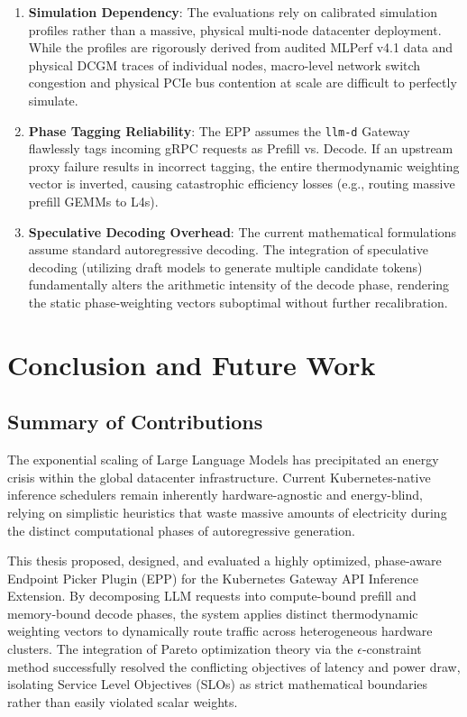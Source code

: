 \documentclass[12pt,a4paper,oneside]{report}
\begin{document}
\begin{enumerate}
    \item \textbf{Simulation Dependency}: The evaluations rely on calibrated simulation profiles rather than a massive, physical multi-node datacenter deployment. While the profiles are rigorously derived from audited MLPerf v4.1 data and physical DCGM traces of individual nodes, macro-level network switch congestion and physical PCIe bus contention at scale are difficult to perfectly simulate.
    \item \textbf{Phase Tagging Reliability}: The EPP assumes the \texttt{llm-d} Gateway flawlessly tags incoming gRPC requests as Prefill vs. Decode. If an upstream proxy failure results in incorrect tagging, the entire thermodynamic weighting vector is inverted, causing catastrophic efficiency losses (e.g., routing massive prefill GEMMs to L4s).
    \item \textbf{Speculative Decoding Overhead}: The current mathematical formulations assume standard autoregressive decoding. The integration of speculative decoding (utilizing draft models to generate multiple candidate tokens) fundamentally alters the arithmetic intensity of the decode phase, rendering the static phase-weighting vectors suboptimal without further recalibration.
\end{enumerate}


\chapter{Conclusion and Future Work}
\label{ch:conclusion}

\section{Summary of Contributions}
\label{sec:conc_summary}

The exponential scaling of Large Language Models has precipitated an energy crisis within the global datacenter infrastructure. Current Kubernetes-native inference schedulers remain inherently hardware-agnostic and energy-blind, relying on simplistic heuristics that waste massive amounts of electricity during the distinct computational phases of autoregressive generation. 

This thesis proposed, designed, and evaluated a highly optimized, phase-aware Endpoint Picker Plugin (EPP) for the Kubernetes Gateway API Inference Extension. By decomposing LLM requests into compute-bound prefill and memory-bound decode phases, the system applies distinct thermodynamic weighting vectors to dynamically route traffic across heterogeneous hardware clusters. The integration of Pareto optimization theory via the \(\epsilon\)-constraint method successfully resolved the conflicting objectives of latency and power draw, isolating Service Level Objectives (SLOs) as strict mathematical boundaries rather than easily violated scalar weights. 
\end{document}
